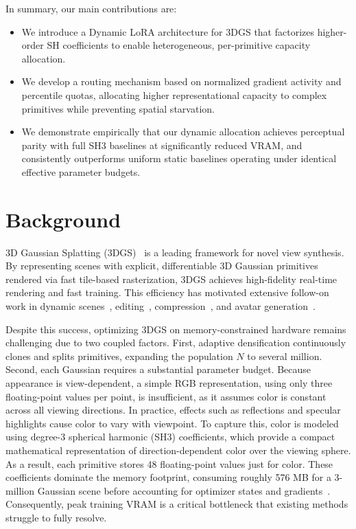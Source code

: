 \documentclass[sigconf]{acmart}
\begin{document}
In summary, our main contributions are:
\begin{itemize}[noitemsep, topsep=0pt]
    \item We introduce a Dynamic LoRA architecture for 3DGS that 
    factorizes higher-order SH coefficients to enable heterogeneous, 
    per-primitive capacity allocation.
    \item We develop a routing mechanism based on normalized gradient activity 
    and percentile quotas, allocating higher representational capacity to 
    complex primitives while preventing spatial starvation.
    \item We demonstrate empirically that our dynamic allocation achieves 
    perceptual parity with full SH3 baselines at significantly reduced VRAM, 
    and consistently outperforms uniform static baselines operating under 
    identical effective parameter budgets. 
\end{itemize}

\section{Background}
\label{sec:background}
3D Gaussian Splatting (3DGS)~\cite{kerbl2023} is a leading framework for novel 
view synthesis. By representing scenes with explicit, differentiable 3D 
Gaussian primitives rendered via fast tile-based rasterization, 3DGS achieves 
high-fidelity real-time rendering and fast training. This efficiency has 
motivated extensive follow-on work in dynamic scenes~\cite{lr4dgstream}, 
editing~\cite{gaussianeditor}, compression~\cite{Papantonakis_2024, survey3dgs}, and avatar 
generation~\cite{avatar}.

Despite this success, optimizing 3DGS on memory-constrained hardware remains 
challenging due to two coupled factors. First, adaptive densification 
continuously clones and splits primitives, expanding the population $N$ to 
several million. Second, each Gaussian requires a substantial parameter budget. 
Because appearance is view-dependent, a simple RGB representation, using only 
three floating-point values per point, is insufficient, as it assumes color is 
constant across all viewing directions. In practice, effects such as reflections 
and specular highlights cause color to vary with viewpoint. To capture this, color 
is modeled using degree-3 spherical harmonic (SH3) coefficients, which provide a 
compact mathematical representation of direction-dependent color over the viewing sphere. 
As a result, each primitive stores 48 floating-point values just for color. 
These coefficients dominate the memory footprint, consuming roughly 576 MB for a 
3-million Gaussian scene before accounting for optimizer states and gradients~\cite{Papantonakis_2024, survey3dgs}.
Consequently, peak training VRAM is a critical bottleneck that existing methods struggle to fully resolve.
\end{document}
